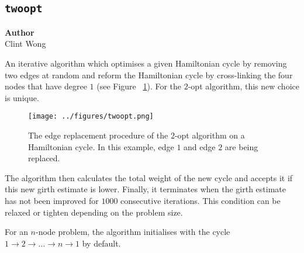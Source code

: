 \subsection{\texttt{twoopt}}
\label{subsec:twoopt}

\begin{flushright}
\textbf{Author} \\
Clint Wong
\end{flushright}

An iterative algorithm which optimises a given Hamiltonian cycle by removing two edges at random and reform the Hamiltonian cycle by cross-linking the four nodes that have degree $1$ (see Figure ~\ref{fig:twoopt}). For the $2$-opt algorithm, this new choice is unique. 

\begin{figure}[h]\centering
        \texttt{[image: ../figures/twoopt.png]}
        \caption{The edge replacement procedure of the $2$-opt algorithm on a Hamiltonian cycle. In this example, edge $1$ and edge $2$ are being replaced. }
        \label{fig:twoopt}
\end{figure}


The algorithm then calculates the total weight of the new cycle and accepts it if this new girth estimate is lower. Finally, it terminates when the girth estimate has not been improved for $1000$ consecutive iterations. This condition can be relaxed or tighten depending on the problem size.  

For an $n$-node problem, the algorithm initialises with the cycle $1 \rightarrow 2 \rightarrow \dots \rightarrow n \rightarrow 1$ by default. 
